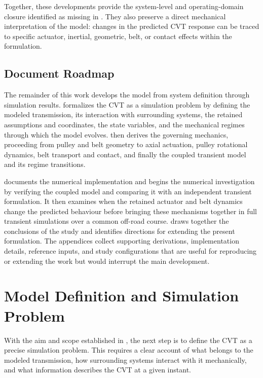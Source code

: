 \documentclass[11pt]{report}
\numberwithin{equation}{section}
\newcounter{assump}
\begin{document}
Together, these developments provide the system-level and operating-domain
closure identified as missing in . They also preserve a
direct mechanical interpretation of the model: changes in the predicted CVT
response can be traced to specific actuator, inertial, geometric, belt, or
contact effects within the formulation.


\section{Document Roadmap}
\label{sec:document-roadmap}

The remainder of this work develops the model from system definition through
simulation results.  formalizes the CVT as a simulation
problem by defining the modeled transmission, its interaction with surrounding
systems, the retained assumptions and coordinates, the state variables, and
the mechanical regimes through which the model evolves.
 then derives the governing mechanics, proceeding from
pulley and belt geometry to axial actuation, pulley rotational dynamics, belt
transport and contact, and finally the coupled transient model and its regime
transitions.

 documents the numerical implementation and begins the
numerical investigation by verifying the coupled model and comparing it with an
independent transient formulation. It then examines when the retained actuator
and belt dynamics change the predicted behaviour before bringing these
mechanisms together in full transient simulations over a common off-road
course.  draws together the conclusions of
the study and identifies directions for extending the present formulation. The
appendices collect supporting derivations, implementation details, reference
inputs, and study configurations that are useful for reproducing or extending
the work but would interrupt the main development.


\chapter{Model Definition and Simulation Problem}
\label{chap:model_setup}

With the aim and scope established in
, the next step is to define the CVT as a
precise simulation problem. This requires a clear account of what belongs to
the modeled transmission, how surrounding systems interact with it
mechanically, and what information describes the CVT at a given instant.
\end{document}

